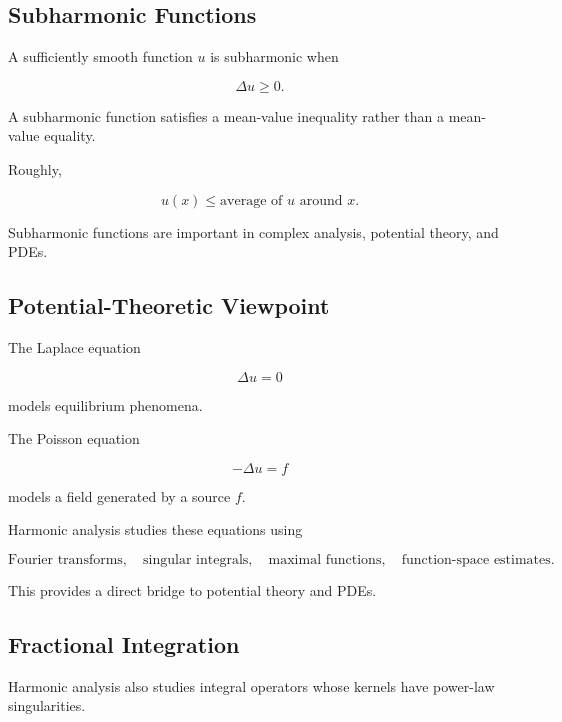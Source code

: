 \subsection{Subharmonic Functions}
\label{subsec:subharmonic-functions}

A sufficiently smooth function \(u\) is subharmonic when

\[
\boxed{
\Delta u\geq0.
}
\]

A subharmonic function satisfies a mean-value inequality rather than a
mean-value equality.

Roughly,

\[
\boxed{
u(x)
\leq
\text{average of }u\text{ around }x.
}
\]

Subharmonic functions are important in complex analysis, potential
theory, and PDEs.

\subsection{Potential-Theoretic Viewpoint}
\label{subsec:harmonic-potential-viewpoint}

The Laplace equation

\[
\Delta u=0
\]

models equilibrium phenomena.

The Poisson equation

\[
\boxed{
-\Delta u=f
}
\]

models a field generated by a source \(f\).

Harmonic analysis studies these equations using

\[
\boxed{
\text{Fourier transforms},
\quad
\text{singular integrals},
\quad
\text{maximal functions},
\quad
\text{function-space estimates}.
}
\]

This provides a direct bridge to potential theory and PDEs.

\subsection{Fractional Integration}
\label{subsec:fractional-integration}

Harmonic analysis also studies integral operators whose kernels have
power-law singularities.

